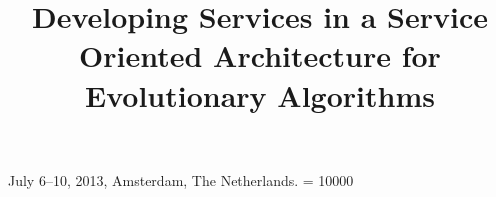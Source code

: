 \documentclass{sig-alternate}
\begin{document}
%
 {July 6--10, 2013, Amsterdam, The Netherlands.} 
\widowpenalty = 10000

\title{Developing Services in a Service Oriented Architecture for Evolutionary Algorithms}

%
%
%
%
%


 
\end{document}
